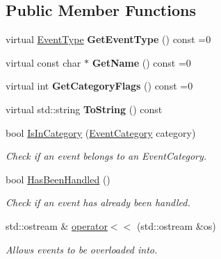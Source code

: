 \subsection*{Public Member Functions}
\begin{DoxyCompactItemize}
\item 
\mbox{\label{classengine_1_1events_1_1Event_a99604df0759386f2cea0071efa52d6e9}} 
virtual \hyperlink{Event_8h_a10b3e1cfc8aaa02ff37fd47f0fae2b8a}{Event\+Type} {\bfseries Get\+Event\+Type} () const =0
\item 
\mbox{\label{classengine_1_1events_1_1Event_a11bf339abb972f3c06f1cf20a0ff894b}} 
virtual const char $\ast$ {\bfseries Get\+Name} () const =0
\item 
\mbox{\label{classengine_1_1events_1_1Event_a24e56efda02b259ac08ecc5ade26963d}} 
virtual int {\bfseries Get\+Category\+Flags} () const =0
\item 
\mbox{\label{classengine_1_1events_1_1Event_afad3baa55387283c7cfe692292edc269}} 
virtual std\+::string {\bfseries To\+String} () const
\item 
bool \hyperlink{classengine_1_1events_1_1Event_abf217454944fb4cceb6dee40d886a0c4}{Is\+In\+Category} (\hyperlink{Event_8h_a1e3bf91397b8a47069494aede2669474}{Event\+Category} category)
\begin{DoxyCompactList}\small\item\em Check if an event belongs to an Event\+Category. \end{DoxyCompactList}\item 
bool \hyperlink{classengine_1_1events_1_1Event_a8d8413f3ea8c3d00b3f43a757a92f623}{Has\+Been\+Handled} ()
\begin{DoxyCompactList}\small\item\em Check if an event has already been handled. \end{DoxyCompactList}\item 
\mbox{\label{classengine_1_1events_1_1Event_aa3b39b29ab7c13070bc033bc88be4152}} 
std\+::ostream \& \hyperlink{classengine_1_1events_1_1Event_aa3b39b29ab7c13070bc033bc88be4152}{operator$<$$<$} (std\+::ostream \&os)
\begin{DoxyCompactList}\small\item\em Allows events to be overloaded into. \end{DoxyCompactList}\end{DoxyCompactItemize}
